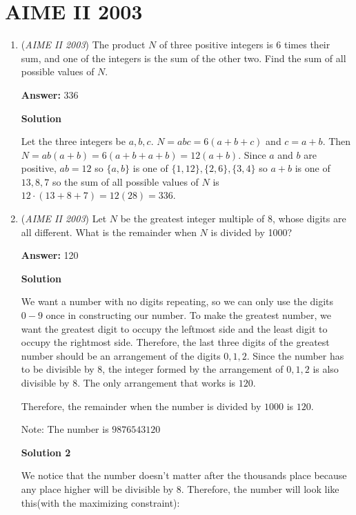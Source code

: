 \section{AIME II 2003}
        \begin{enumerate}
        	\item (\textit{AIME II 2003}) The product $N$ of three positive integers is 6 times their sum, and one of the integers is the sum of the other two. Find the sum of all possible values of $N$.


 
 \textbf{Answer: }336



\textbf{Solution}

Let the three integers be $a, b, c$.  $N = abc = 6(a + b + c)$ and $c = a + b$.  Then $N = ab(a + b) = 6(a + b + a + b) = 12(a + b)$.  Since $a$ and $b$ are positive, $ab = 12$ so $\{a, b\}$ is one of $\{1, 12\}, \{2, 6\}, \{3, 4\}$ so $a + b$ is one of $13, 8, 7$ so the sum of all possible values of $N$ is $12 \cdot (13 + 8 + 7) = 12(28) = \boxed{336}$.

 


	\item (\textit{AIME II 2003}) Let $N$ be the greatest integer multiple of 8, whose digits are all different. What is the remainder when $N$ is divided by 1000?


 
 \textbf{Answer: }120



\textbf{Solution}

We want a number with no digits repeating, so we can only use the digits $0-9$ once in constructing our number. To make the greatest number, we want the greatest digit to occupy the leftmost side and the least digit to occupy the rightmost side. Therefore, the last three digits of the greatest number should be an arrangement of the digits $0,1,2$. Since the number has to be divisible by 8, the integer formed by the arrangement of $0,1,2$ is also divisible by 8. The only arrangement that works is $120$. 

 Therefore, the remainder when the number is divided by $1000$ is $\boxed{120}$.

 Note: The number is $9876543120$




\textbf{Solution 2}

We notice that the number doesn't matter after the thousands place because any place higher will be divisible by 8. Therefore, the number will look like this(with the maximizing constraint):


\end{enumerate}
